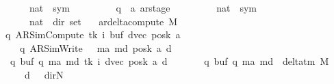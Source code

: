 \begin{isabellebody}
\ \ \ \ \ \ \ \ {\isasymtimes}\ {\isacharparenleft}{\kern0pt}nat\ {\isasymRightarrow}\ sym{}{\isacharparenright}{\kern0pt}\isanewline
\ \ \ \ \ \ \ \ {\isasymtimes}\ {\isacharparenleft}{\kern0pt}{\isacharprime}{\kern0pt}q\ {\isasymtimes}\ {\isacharprime}{\kern0pt}a\ ar{\isacharunderscore}{\kern0pt}stage{\isacharparenright}{\kern0pt}\isanewline
\ \ \ \ \ \ \ \ {\isasymtimes}\ {\isacharparenleft}{\kern0pt}nat\ {\isasymRightarrow}\ sym{}{\isacharparenright}{\kern0pt}\isanewline
\ \ \ \ \ \ \ \ {\isasymtimes}\ {\isacharparenleft}{\kern0pt}nat\ {\isasymRightarrow}\ dir{\isacharparenright}{\kern0pt}{\isacharparenright}{\kern0pt}\ set{\isachardoublequoteclose}\ \isanewline
\ \ {\isachardoublequoteopen}ar{\isacharunderscore}{\kern0pt}delta{\isacharunderscore}{\kern0pt}compute\ M\ {\isacharequal}{\kern0pt}\isanewline
\ \ \ \ {\isacharbraceleft}{\kern0pt}{\isacharparenleft}{\kern0pt}{\isacharparenleft}{\kern0pt}q{\isacharcomma}{\kern0pt}\ AR{\isacharunderscore}{\kern0pt}SimCompute{\isacharcomma}{\kern0pt}\ tk{\isacharcomma}{\kern0pt}\ i{\isacharcomma}{\kern0pt}\ buf{\isacharcomma}{\kern0pt}\ dvec{\isacharcomma}{\kern0pt}\ posk{\isacharparenright}{\kern0pt}{\isacharcomma}{\kern0pt}\ a{\isacharcomma}{\kern0pt}\isanewline
\ \ \ \ \ \ \ {\isacharparenleft}{\kern0pt}q{\isacharprime}{\kern0pt}{\isacharcomma}{\kern0pt}\ AR{\isacharunderscore}{\kern0pt}SimWrite{\isacharcomma}{\kern0pt}\ {}{\isacharcomma}{\kern0pt}\ {}{\isacharcomma}{\kern0pt}\ m{\isacharunderscore}{\kern0pt}a{\isacharprime}{\kern0pt}{\isacharcomma}{\kern0pt}\ m{\isacharunderscore}{\kern0pt}d{\isacharcomma}{\kern0pt}\ posk{\isacharparenright}{\kern0pt}{\isacharcomma}{\kern0pt}\ a{\isacharcomma}{\kern0pt}\ d{\isacharparenright}{\kern0pt}\ {\isacharbar}{\kern0pt}\isanewline
\ \ \ \ \ q\ buf\ q{\isacharprime}{\kern0pt}\ m{\isacharunderscore}{\kern0pt}a{\isacharprime}{\kern0pt}\ m{\isacharunderscore}{\kern0pt}d\ tk\ i\ dvec\ posk\ a\ d{\isachardot}{\kern0pt}\isanewline
\ \ \ \ \ \ \ {\isacharparenleft}{\kern0pt}q{\isacharcomma}{\kern0pt}\ buf{\isacharcomma}{\kern0pt}\ q{\isacharprime}{\kern0pt}{\isacharcomma}{\kern0pt}\ m{\isacharunderscore}{\kern0pt}a{\isacharprime}{\kern0pt}{\isacharcomma}{\kern0pt}\ m{\isacharunderscore}{\kern0pt}d{\isacharparenright}{\kern0pt}\ {\isasymin}\ delta{\isacharunderscore}{\kern0pt}tm\ M\isanewline
\ \ \ \ \ \ \ {\isasymand}\ d\ {\isacharequal}{\kern0pt}\ {\isacharparenleft}{\kern0pt}{\isasymlambda}{\isacharunderscore}{\kern0pt}{\isachardot}{\kern0pt}\ dir{\isachardot}{\kern0pt}N{\isacharparenright}{\kern0pt}{\isacharbraceright}{\kern0pt}{\isachardoublequoteclose}\isanewline

\end{isabellebody}
